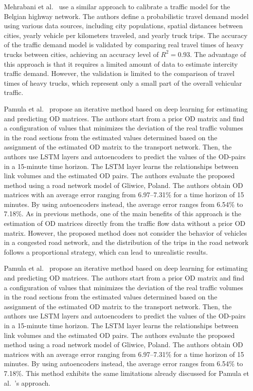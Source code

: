 Mehrabani et al.~\cite{mehrabani2023development} use a similar approach to calibrate a traffic model for the Belgian highway network. The authors define a probabilistic travel demand model using various data sources, including city populations, spatial distances between cities, yearly vehicle per kilometers traveled, and yearly truck trips. The accuracy of the traffic demand model is validated by comparing real travel times of heavy trucks between cities, achieving an accuracy level of $R^2 = 0.93$. The advantage of this approach is that it requires a limited amount of data to estimate intercity traffic demand. However, the validation is limited to the comparison of travel times of heavy trucks, which represent only a small part of the overall vehicular traffic.

Pamula et al.~\cite{PAMULA2023105550} propose an iterative method based on deep learning for estimating and predicting OD matrices. The authors start from a prior OD matrix and find a configuration of values that minimizes the deviation of the real traffic volumes in the road sections from the estimated values determined based on the assignment of the estimated OD matrix to the transport network. Then, the authors use LSTM layers and autoencoders to predict the values of the OD-pairs in a 15-minute time horizon. The LSTM layer learns the relationships between link volumes and the estimated OD pairs. The authors evaluate the proposed method using a road network model of Gliwice, Poland. The authors obtain OD matrices with an average error ranging from 6.97–7.31\% for a time horizon of 15 minutes. By using autoencoders instead, the average error ranges from 6.54\% to 7.18\%. As in previous methods, one of the main benefits of this approach is the estimation of OD matrices directly from the traffic flow data without a prior OD matrix. However, the proposed method does not consider the behavior of vehicles in a congested road network, and the distribution of the trips in the road network follows a proportional strategy, which can lead to unrealistic results.

Pamula et al.~\cite{PAMULA2023105550} propose an iterative method based on deep learning for estimating and predicting OD matrices. The authors start from a prior OD matrix and find a configuration of values that minimizes the deviation of the real traffic volumes in the road sections from the estimated values determined based on the assignment of the estimated OD matrix to the transport network. Then, the authors use LSTM layers and autoencoders to predict the values of the OD-pairs in a 15-minute time horizon. The LSTM layer learns the relationships between link volumes and the estimated OD pairs. The authors evaluate the proposed method using a road network model of Gliwice, Poland. The authors obtain OD matrices with an average error ranging from 6.97–7.31\% for a time horizon of 15 minutes. By using autoencoders instead, the average error ranges from 6.54\% to 7.18\%. This method exhibits the same limitations already discussed for Pamula et al.~\cite{PAMULA2023105550}'s approach.

